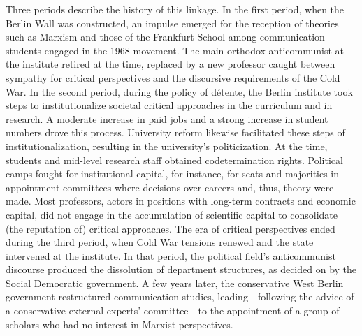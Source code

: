 \documentclass{tufte-handout}
\begin{document}
Three periods describe the history of this linkage. In the first period,
when the Berlin Wall was constructed, an impulse emerged for the
reception of theories such as Marxism and those of the Frankfurt School
among communication students engaged in the 1968 movement. The main
orthodox anticommunist at the institute retired at the time, replaced by
a new professor caught between sympathy for critical perspectives and
the discursive requirements of the Cold War. In the second period,
during the policy of détente, the Berlin institute took steps to
institutionalize societal critical approaches in the curriculum and in
research. A moderate increase in paid jobs and a strong increase in
student numbers drove this process. University reform likewise
facilitated these steps of institutionalization, resulting in the
university's politicization. At the time, students and mid-level
research staff obtained codetermination rights. Political camps fought
for institutional capital, for instance, for seats and majorities in
appointment committees where decisions over careers and, thus, theory
were made. Most professors, actors in positions with long-term contracts
and economic capital, did not engage in the accumulation of scientific
capital to consolidate (the reputation of) critical approaches. The era
of critical perspectives ended during the third period, when Cold War
tensions renewed and the state intervened at the institute. In that
period, the political field's anticommunist discourse produced the
dissolution of department structures, as decided on by the Social
Democratic government. A few years later, the conservative West Berlin
government restructured communication studies, leading---following the
advice of a conservative external experts' committee---to the
appointment of a group of scholars who had no interest in Marxist
perspectives.
\end{document}
